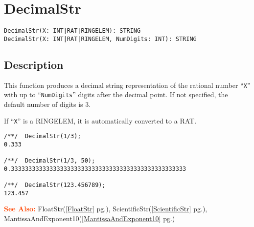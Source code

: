 \documentclass[a4paper]{mybook}
\newenvironment{command}{}{} %
\newcommand\SeeAlso{\par\textcolor{OrangeRed}{\textbf{\large See Also: }}}
\begin{document}
\section{DecimalStr}
\label{DecimalStr}
\begin{command} %


\begin{Verbatim}[label=syntax, rulecolor=\color{MidnightBlue},
frame=single]
DecimalStr(X: INT|RAT|RINGELEM): STRING
DecimalStr(X: INT|RAT|RINGELEM, NumDigits: INT): STRING
\end{Verbatim}


\subsection*{Description}

This function produces a decimal string representation of the rational
number ``\verb&X&'' with up to ``\verb&NumDigits&'' digits after the decimal point.  If
not specified, the default number of digits is 3.
\par 
If ``\verb&X&'' is a RINGELEM, it is automatically converted to a RAT.
\begin{Verbatim}[label=example, rulecolor=\color{PineGreen}, frame=single]
/**/  DecimalStr(1/3);
0.333

/**/  DecimalStr(1/3, 50);
0.33333333333333333333333333333333333333333333333333

/**/  DecimalStr(123.456789);
123.457
\end{Verbatim}


\SeeAlso %
  FloatStr(\ref{FloatStr} pg.\pageref{FloatStr}), 
    ScientificStr(\ref{ScientificStr} pg.\pageref{ScientificStr}), 
    MantissaAndExponent10(\ref{MantissaAndExponent10} pg.\pageref{MantissaAndExponent10})
\end{command} %
\end{document}
